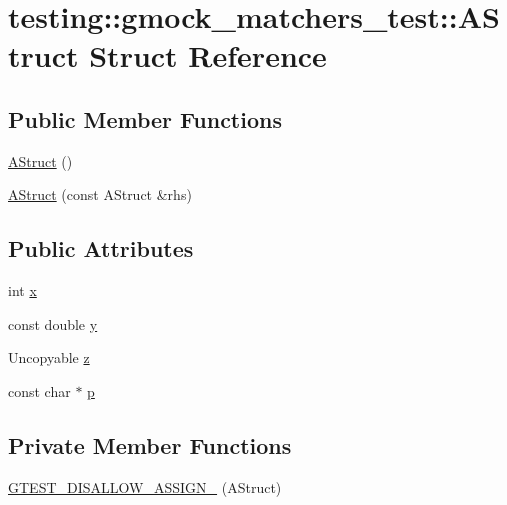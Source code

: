 \hypertarget{structtesting_1_1gmock__matchers__test_1_1_a_struct}{}\section{testing\+::gmock\+\_\+matchers\+\_\+test\+::A\+Struct Struct Reference}
\label{structtesting_1_1gmock__matchers__test_1_1_a_struct}
\subsection*{Public Member Functions}
\begin{DoxyCompactItemize}
\item 
\mbox{\hyperlink{structtesting_1_1gmock__matchers__test_1_1_a_struct_a6774561607c8ca64809e9ebde4b62b0e}{A\+Struct}} ()
\item 
\mbox{\hyperlink{structtesting_1_1gmock__matchers__test_1_1_a_struct_ac5b9c0054e929e8883e13123aef50ff3}{A\+Struct}} (const A\+Struct \&rhs)
\end{DoxyCompactItemize}
\subsection*{Public Attributes}
\begin{DoxyCompactItemize}
\item 
int \mbox{\hyperlink{structtesting_1_1gmock__matchers__test_1_1_a_struct_a539eea02599ad34ff2bf90cc2c1adf26}{x}}
\item 
const double \mbox{\hyperlink{structtesting_1_1gmock__matchers__test_1_1_a_struct_a08b8592764aa4775c3d5a3542470f8bb}{y}}
\item 
Uncopyable \mbox{\hyperlink{structtesting_1_1gmock__matchers__test_1_1_a_struct_a45b1006e4a7b21037610a385dcae6d8c}{z}}
\item 
const char $\ast$ \mbox{\hyperlink{structtesting_1_1gmock__matchers__test_1_1_a_struct_a65755db7d763d53c13483bb520f1efcd}{p}}
\end{DoxyCompactItemize}
\subsection*{Private Member Functions}
\begin{DoxyCompactItemize}
\item 
\mbox{\hyperlink{structtesting_1_1gmock__matchers__test_1_1_a_struct_adae118a4bef01eaa9cc2cf00cb80eddc}{G\+T\+E\+S\+T\+\_\+\+D\+I\+S\+A\+L\+L\+O\+W\+\_\+\+A\+S\+S\+I\+G\+N\+\_\+}} (A\+Struct)
\end{DoxyCompactItemize}


